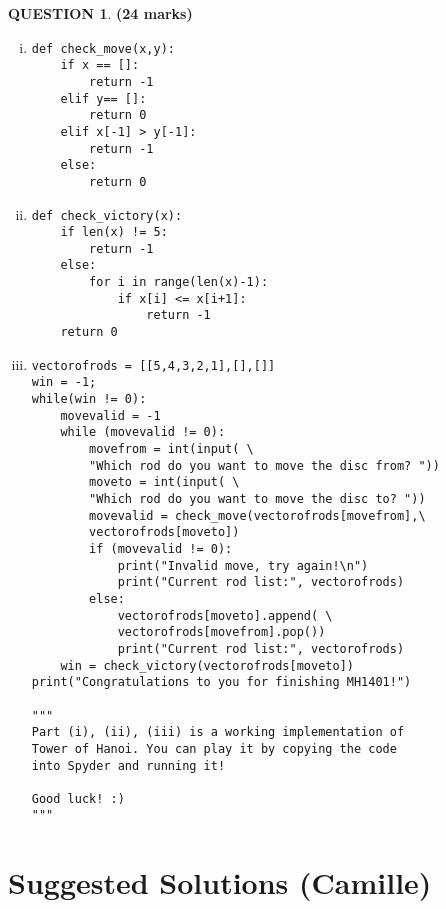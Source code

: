 \documentclass[a4paper,12pt]{article}
\theoremstyle{definition}
\newtheorem{ques}[dummy]{QUESTION}
\theoremstyle{plain}
\newcommand{\py}{python}
\begin{document}
\begin{ques}\hfill \textbf{(24 marks)}\vspace*{1em}
	\begin{enumerate}[(i)]
\item
\begin{verbatim}
def check_move(x,y):
    if x == []:
        return -1
    elif y== []:
        return 0
    elif x[-1] > y[-1]:
        return -1
    else:
        return 0
\end{verbatim}
\item 
\begin{verbatim}
def check_victory(x):
    if len(x) != 5:
        return -1
    else:
        for i in range(len(x)-1):
            if x[i] <= x[i+1]:
                return -1
    return 0
\end{verbatim}
\newpage
\item 
\begin{verbatim} 
vectorofrods = [[5,4,3,2,1],[],[]]
win = -1;
while(win != 0):
    movevalid = -1
    while (movevalid != 0):
        movefrom = int(input( \
        "Which rod do you want to move the disc from? "))
        moveto = int(input( \
        "Which rod do you want to move the disc to? "))
        movevalid = check_move(vectorofrods[movefrom],\
        vectorofrods[moveto])
        if (movevalid != 0):
            print("Invalid move, try again!\n")
            print("Current rod list:", vectorofrods)
        else:
            vectorofrods[moveto].append( \
            vectorofrods[movefrom].pop())
            print("Current rod list:", vectorofrods)
    win = check_victory(vectorofrods[moveto])
print("Congratulations to you for finishing MH1401!")

"""
Part (i), (ii), (iii) is a working implementation of 
Tower of Hanoi. You can play it by copying the code 
into Spyder and running it!

Good luck! :)
"""
\end{verbatim}
	\end{enumerate}
\end{ques}

	\newpage
	\section*{Suggested Solutions (Camille)}
\end{document}
